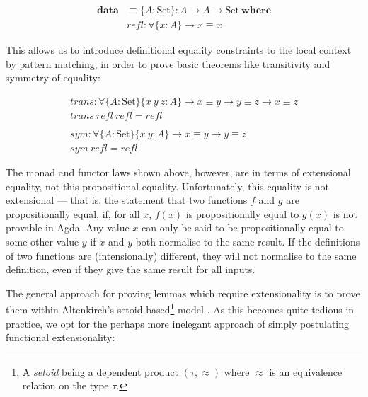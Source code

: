\documentclass[a4paper]{jfp}
\begin{document}
\begin{displaymath}
	\begin{array}{ll}
	\textbf{data} &\! \equiv \{A : \text{Set}\} : A \rightarrow A \rightarrow \text{Set}\ \textbf{where} \\
	              &\! \mathit{refl} : \forall \{x : A\} \rightarrow x \equiv x
    \end{array}
\end{displaymath}

\medskip

This allows us to introduce definitional equality constraints to the local context by pattern matching, in order to prove basic theorems like
transitivity and symmetry of equality:

\begin{displaymath}
	\begin{array}{l}
		\mathit{trans} :  \forall \{A : \text{Set}\}\{x\ y\ z : A\} \rightarrow x \equiv y \rightarrow y \equiv z \rightarrow x \equiv z \\
		\mathit{trans}\ \mathit{refl}\ \mathit{refl} = \mathit{refl} \\
		\\
		\mathit{sym} : \forall \{A : \text{Set}\}\{x\ y : A\} \rightarrow x \equiv y \rightarrow y \equiv z \\
		\mathit{sym}\ \mathit{refl} = \mathit{refl}
    \end{array}
\end{displaymath}

The monad and functor laws shown above, however, are in terms of extensional equality, not this propositional equality. Unfortunately, this equality
is not extensional --- that is, the statement that two functions $f$ and $g$ are propositionally equal, if, for all $x$, $f(x)$ is propositionally
equal to $g(x)$ is not provable in Agda. Any value $x$ can only be said to be propositionally equal to some other value $y$ if $x$ and $y$ both
normalise to the same result. If the definitions of two functions are (intensionally) different, they will not normalise to the same definition, even
if they give the same result for all inputs.

The general approach for proving lemmas which require extensionality is to prove them within Altenkirch's setoid-based\footnote{A \emph{setoid} being
   a dependent product $(\tau, \approx)$ where $\approx$ is an equivalence relation on the type $\tau$.} model
\cite{Altenkirch:1999:EEI:788021.788977}. As this becomes quite tedious in practice, we opt for the perhaps more inelegant approach of simply
postulating functional extensionality:
\end{document}
